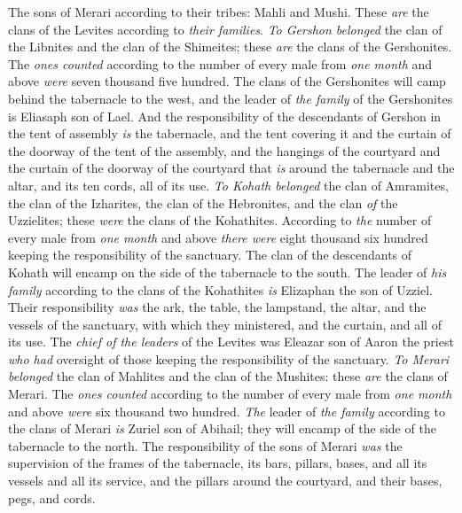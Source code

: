 \begin{biblechapter}
\verse The sons of Merari according to their tribes: Mahli and Mushi. These \textit{are} the clans of the Levites according to \textit{their families}.
\verse \textit{To Gershon belonged} the clan of the Libnites and the clan of the Shimeites; these \textit{are} the clans of the Gershonites.
\verse The \textit{ones counted} according to the number of every male from \textit{one month} and above \textit{were} seven thousand five hundred.
\verse The clans of the Gershonites will camp behind the tabernacle to the west,
\verse and the leader of \textit{the family} of the Gershonites is Eliasaph son of Lael.
\verse And the responsibility of the descendants of Gershon in the tent of assembly \textit{is} the tabernacle, and the tent covering it and the curtain of the doorway of the tent of the assembly,
\verse and the hangings of the courtyard and the curtain of the doorway of the courtyard that \textit{is} around the tabernacle and the altar, and its ten cords, all of its use.
\verse \textit{To Kohath belonged} the clan of Amramites, the clan of the Izharites, the clan of the Hebronites, and the clan \textit{of} the Uzzielites; these \textit{were} the clans of the Kohathites.
\verse According to \textit{the} number of every male from \textit{one month} and above \textit{there were} eight thousand six hundred keeping the responsibility of the sanctuary.
\verse The clan of the descendants of Kohath will encamp on the side of the tabernacle to the south.
\verse The leader of \textit{his family} according to the clans of the Kohathites \textit{is} Elizaphan the son of Uzziel.
\verse Their responsibility \textit{was} the ark, the table, the lampstand, the altar, and the vessels of the sanctuary, with which they ministered, and the curtain, and all of its use.
\verse The \textit{chief of the leaders} of the Levites was Eleazar son of Aaron the priest \textit{who had} oversight of those keeping the responsibility of the sanctuary.
\verse \textit{To Merari belonged} the clan of Mahlites and the clan of the Mushites: these \textit{are} the clans of Merari.
\verse The \textit{ones counted} according to the number of every male from \textit{one month} and above \textit{were} six thousand two hundred.
\verse \textit{The} leader of \textit{the family} according to the clans of Merari \textit{is} Zuriel son of Abihail; they will encamp of the side of the tabernacle to the north.
\verse The responsibility of the sons of Merari \textit{was} the supervision of the frames of the tabernacle, its bars, pillars, bases, and all its vessels and all its service,
\verse and the pillars around the courtyard, and their bases, pegs, and cords.

\end{biblechapter}
